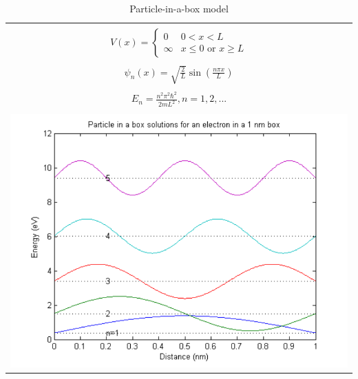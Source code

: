 \message{ !name(Outline.tex)}\documentclass[11pt]{article}
\begin{document}
\begin{outline}
\begin{outline}
  \end{outline}
\begin{table}[tb]
   \begin{center}
   \caption{Particle-in-a-box model}
    \label{Particle-in-a-box}
\begin{tabular}[h]{|c|}
\hline
 \\
$\displaystyle       V(x) = \left \{
        \begin{array}{rl}
          0 & 0 < x < L \\
          \infty & x \leq 0 \text{ or } x \geq L
        \end{array} \right . $ \\
 \\
$\displaystyle     \psi_n(x) =\sqrt{\frac{2}{L}} \sin \left ( \frac{n\pi x}{L} \right )$
\\ 
 \\
$\displaystyle     E_n =\frac{n^2\pi^2\hbar^2}{2mL^2}, n = 1, 2, ...$ \\
 \\
     \includegraphics[scale=.6]{Images/PIB} \\       
\hline
\end{tabular}
 \end{center}
\end{table}



\end{outline}
\end{document}
